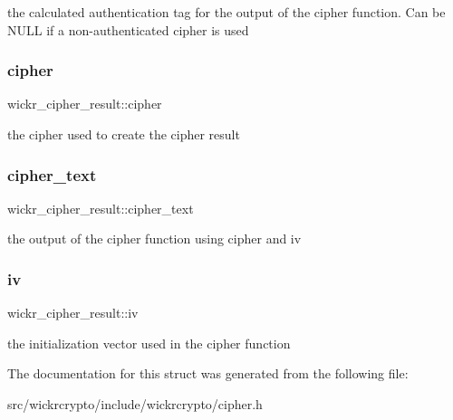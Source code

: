 the calculated authentication tag for the output of the cipher function. Can be N\+U\+LL if a non-\/authenticated cipher is used \mbox{\label{structwickr__cipher__result_a80f15a012dbe1342d0aaa6f3e7072aa9}} 
\subsubsection{\texorpdfstring{cipher}{cipher}}
{\footnotesize\ttfamily wickr\+\_\+cipher\+\_\+result\+::cipher}

the cipher used to create the cipher result \mbox{\label{structwickr__cipher__result_a29fe7c04025f39cc574ac41f846d167a}} 
\subsubsection{\texorpdfstring{cipher\+\_\+text}{cipher\_text}}
{\footnotesize\ttfamily wickr\+\_\+cipher\+\_\+result\+::cipher\+\_\+text}

the output of the cipher function using \textquotesingle{}cipher\textquotesingle{} and \textquotesingle{}iv\textquotesingle{} \mbox{\label{structwickr__cipher__result_a741b49cc09cddfce1924e7a26ab8b35b}} 
\subsubsection{\texorpdfstring{iv}{iv}}
{\footnotesize\ttfamily wickr\+\_\+cipher\+\_\+result\+::iv}

the initialization vector used in the cipher function 

The documentation for this struct was generated from the following file\+:\begin{DoxyCompactItemize}
\item 
src/wickrcrypto/include/wickrcrypto/cipher.\+h\end{DoxyCompactItemize}
